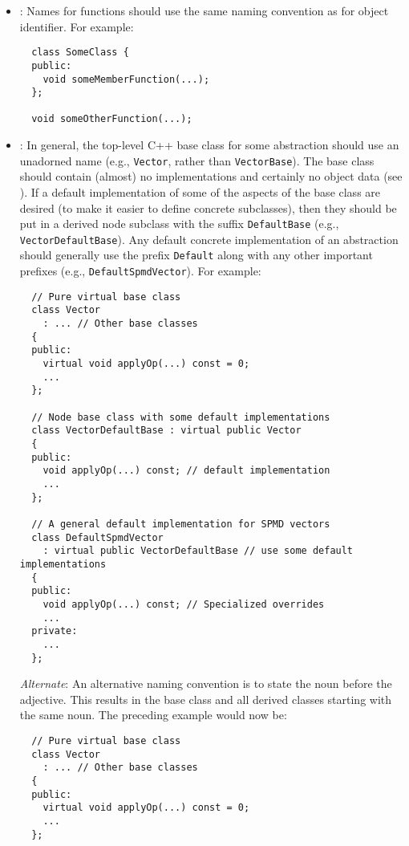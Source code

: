 \begin{itemize}
\item\NCFunctionNames: Names for functions should use the same naming
  convention as for object identifier.  For example:

{\small\begin{verbatim}
  class SomeClass {
  public:
    void someMemberFunction(...);
  };

  void someOtherFunction(...);
\end{verbatim}}


\item\NCBaseDefaultClassNames: In general, the top-level C++ base
  class for some abstraction should use an unadorned name (e.g.,
  \texttt{Vector}, rather than \texttt{VectorBase}).  The base class
  should contain (almost) no implementations and certainly no object
  data (see \cite[Item 36]{C++CodingStandards05}).  If a default
  implementation of some of the aspects of the base class are desired
  (to make it easier to define concrete subclasses), then they should
  be put in a derived node subclass with the suffix
  \texttt{DefaultBase} (e.g., \texttt{Vector\-Default\-Base}).  Any
  default concrete implementation of an abstraction should generally
  use the prefix \texttt{Default} along with any other important
  prefixes (e.g., \texttt{DefaultSpmdVector}).  For example:

{\small\begin{verbatim}
  // Pure virtual base class 
  class Vector
    : ... // Other base classes
  {
  public:
    virtual void applyOp(...) const = 0;
    ...
  };

  // Node base class with some default implementations
  class VectorDefaultBase : virtual public Vector
  {
  public:
    void applyOp(...) const; // default implementation
    ...
  };

  // A general default implementation for SPMD vectors
  class DefaultSpmdVector
    : virtual public VectorDefaultBase // use some default implementations
  {
  public:
    void applyOp(...) const; // Specialized overrides
    ...
  private:
    ...
  };
\end{verbatim}}

  \textit{Alternate}: An alternative naming convention is to state the
  noun before the adjective.  This results in the base class and all derived classes starting with the same noun.  The preceding example would now be:

{\small\begin{verbatim}
  // Pure virtual base class 
  class Vector
    : ... // Other base classes
  {
  public:
    virtual void applyOp(...) const = 0;
    ...
  };


\end{verbatim}}
\end{itemize}
